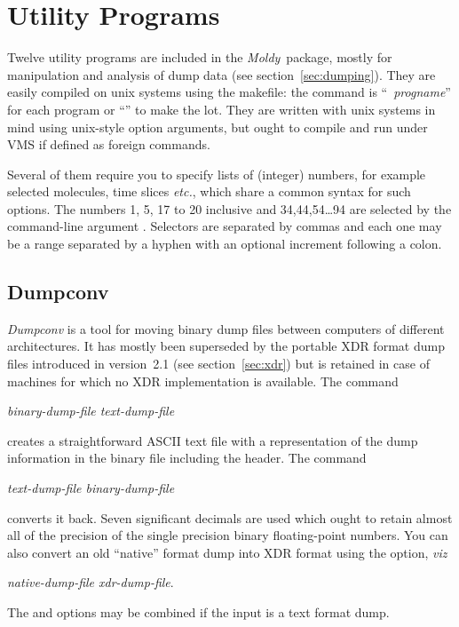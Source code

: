 \documentclass[a4paper,twoside]{report}
\newcommand{\moldy}{\emph{Moldy}}
\newcommand{\etc}{\emph{etc.}}
\begin{document}
\chapter{Utility Programs} %
Twelve utility programs are included in the \moldy\ package, mostly for
manipulation and analysis of dump data (see section~\ref{sec:dumping}).
They are easily compiled on unix systems using the makefile: the
command is ``~\emph{progname}'' for each program or
``'' to make the lot.  They are written with
unix systems in mind using unix-style option arguments, but ought to
compile and run under VMS if defined as foreign commands.

Several of them require you to specify lists of (integer) numbers, for
example selected molecules, time slices \etc, which share a common
syntax for such options. The numbers 1, 5, 17 to 20 inclusive and
34,44,54\ldots94 are selected by the command-line argument
\mbox{}.  Selectors are separated by
commas and each one may be a range separated by a hyphen with an
optional increment following a colon.

\section{Dumpconv}%
\label{sec:dumpconv}
\emph{Dumpconv} is a tool for moving binary dump files between
computers of different architectures.  It has mostly been superseded
by the portable XDR format dump files introduced in version~2.1 (see
section~\ref{sec:xdr}) but is retained in case of machines for which
no XDR implementation is available.  The command
\begin{center}
 \textit{binary-dump-file text-dump-file} 
\end{center}
creates a straightforward ASCII text file with a representation of the
dump information in the binary file including the header.  The command
\begin{center}
 \textit{text-dump-file binary-dump-file} 
\end{center}
converts it back.  Seven significant decimals are used which ought to
retain almost all of the precision of the single precision binary
floating-point numbers.  You can also convert an old ``native'' format
dump into XDR format using the  option, \emph{viz}
\begin{center}
 \textit{native-dump-file xdr-dump-file}. 
\end{center}
The  and  options may be combined if the input is a
text format dump.
\end{document}
